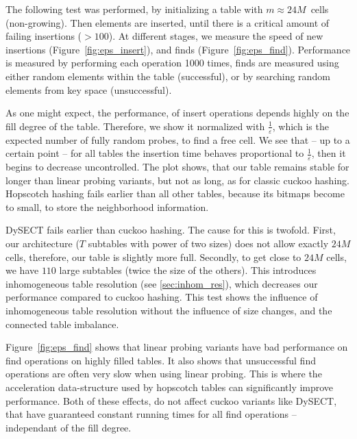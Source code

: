 \documentclass[a4paper,UKenglish]{lipics-v2016}
\begin{document}
The following test was performed, by initializing a table with
$m\approx24M$~cells (non-growing). Then elements are inserted, until there
is a critical amount of failing insertions ($>100$).  At different
stages, we measure the speed of new insertions
(Figure~\ref{fig:eps_insert}), and finds (Figure~\ref{fig:eps_find}).
Performance is measured by performing each operation 1000 times, finds
are measured using either random elements within the table (successful), or by
searching random elements from key space (unsuccessful).

As one might expect, the performance, of insert operations depends
highly on the fill degree of the table.  Therefore, we show it
normalized with $\frac{1}{\varepsilon}$, which is the expected number
of fully random probes, to find a free cell. We see that -- up to a
certain point -- for all tables the insertion time behaves
proportional to $\frac{1}{\varepsilon}$, then it begins to decrease
uncontrolled.  The plot shows, that our table remains stable for
longer than linear probing variants, but not as long, as for classic
cuckoo hashing.  Hopscotch hashing fails earlier than all other
tables, because its bitmaps become to small, to store the neighborhood
information.

DySECT fails earlier than cuckoo hashing.  The cause for this is
twofold. First, our architecture ($T$ subtables with power of two
sizes) does not allow exactly $24M$ cells, therefore, our table is
slightly more full. Secondly, to get close to $24M$ cells, we have
$110$ large subtables (twice the size of the others).  This introduces
inhomogeneous table resolution (see \ref{sec:inhom_res}), which
decreases our performance compared to cuckoo hashing.  This test shows
the influence of inhomogeneous table resolution without the influence
of size changes, and the connected table imbalance.

Figure~\ref{fig:eps_find} shows that linear probing variants have bad
performance on find operations on highly filled tables.  It also shows
that unsuccessful find operations are often very slow when using
linear probing.  This is where the acceleration data-structure used by
hopscotch tables can significantly improve performance.  Both of these
effects, do not affect cuckoo variants like DySECT, that have
guaranteed constant running times for all find operations --
independant of the fill degree.
\end{document}
